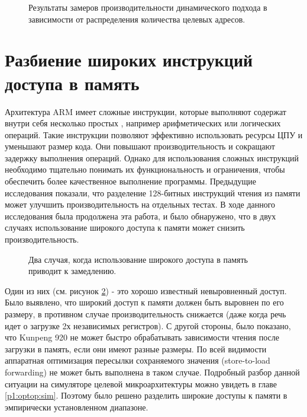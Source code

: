 \begin{figure}[ht]
	\caption{Результаты замеров производительности динамического подхода в зависимости от распределения количества целевых адресов.}\label{fig:ICP2}
\end{figure}


 \section {Разбиение широких инструкций доступа в память} \label{ch2:split_ldp_stp}
Архитектура ARM имеет сложные инструкции, которые выполняют содержат внутри себя несколько простых , например арифметических или логических операций. Такие инструкции позволяют эффективно использовать ресурсы ЦПУ и уменьшают размер кода. Они повышают производительность и сокращают задержку выполнения операций. Однако для использования сложных инструкций необходимо тщательно понимать их функциональность и ограничения, чтобы обеспечить более качественное выполнение программы. Предыдущие исследования \cite{park2019microarchitecture} показали, что разделение 128-битных инструкций чтения из памяти  может улучшить производительность на отдельных тестах. В ходе данного исследования была продолжена эта работа, и было обнаружено, что в двух случаях использование широкого доступа к памяти может снизить производительность.

\begin{figure}[htbp]
	\centering
	
	\caption{Два случая, когда использование широкого доступа в память приводит к замедлению.}
	\label{splitsvg1}
\end{figure}

Один из них (см. рисунок \ref{splitsvg1}) - это хорошо известный невыровненный доступ. Было выявлено, что широкий доступ к памяти должен быть выровнен по его размеру, в противном случае производительность снижается (даже когда речь идет о загрузке 2х независимых регистров). С другой стороны, было показано, что Kunpeng 920 не может быстро обрабатывать зависимости чтения после загрузки в память, если они имеют разные размеры. По всей видимости аппаратная оптимизация пересылки сохраняемого значения (store-to-load forwarding) \cite{shen2013modern} не может быть выполнена в таком случае. Подробный разбор данной ситуации на симуляторе целевой микроархитектуры можно увидеть в главе \ref{p1:optop:sim}. Поэтому было решено разделить широкие доступы к памяти в эмпирически установленном диапазоне.



